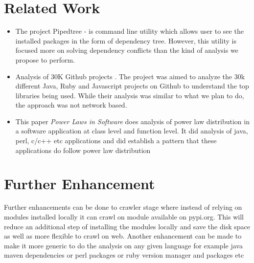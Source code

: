 \section{Related Work} \label{relwork}
\begin {itemize}
\item
The project Pipedtree - \cite{www-pipdeptree} is command
line utility which allows user to see the installed packages in the form of
dependency tree. However, this utility is focused more on solving dependency
conflicts than the kind of analysis we propose to perform.

\item
Analysis of 30K Github projects \cite{www-takipi}.
The project was aimed to analyze the 30k different Java, Ruby and Javascript
projects on Github to understand the top libraries being used. While their
analysis was similar to what we plan to do, the approach was not network based.

\item
This paper \textit{Power Laws in Software} \cite{louridas2008power} 
does analysis of power law distribution in a software application at class 
level and function level. It did analysis of java, perl, c/c++ etc applications 
and did establish a pattern that  these applications do follow power law distribution

\end {itemize}

\section{Further Enhancement} \label{enhancements}
Further enhancements can be done to crawler stage where instead of relying on
modules installed locally it can crawl on module available on pypi.org. This will 
reduce an additional step of installing the modules locally and save the disk space
as well as more flexible to crawl on web. Another enhancement can be made to make it
more generic to do the analysis on any given language for example java maven 
dependencies or perl packages or ruby version manager and packages etc
